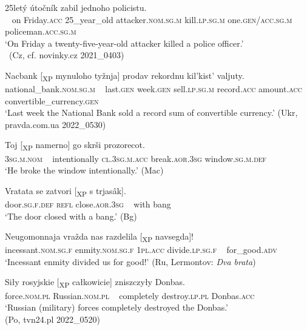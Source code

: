 \documentclass[output=paper]{langscibook}
\begin{document}
\ea%
    \label{ex:junghanns:1}
  \ea  {} 25letý útočník zabil jednoho policistu.\\
    ~ on Friday.\textsc{acc} 25\_year\_old attacker.\textsc{nom.sg.m} kill.\textsc{lp.sg.m} one.\textsc{gen/acc.sg.m} policeman.\textsc{acc.sg.m}\\
    \glt ‘On Friday a twenty-five-year-old attacker killed a police officer.’ \\\ \hfill (Cz, cf. novinky.cz 2021\_0403) \label{ex:junghanns:1a}

  \ex  \gll   Nacbank               [\textsubscript{XP} mynuloho tyžnja] prodav rekordnu  kil’kist’ valjuty.\\
    national\_bank.\textsc{nom.sg.m} ~                 last.\textsc{gen} week.\textsc{gen} sell.\textsc{lp.sg.m} record.\textsc{acc}  amount.\textsc{acc} convertible\_currency.\textsc{gen}\\
    \glt ‘Last week the National Bank sold a record sum of convertible currency.’ \hfill (Ukr, pravda.com.ua 2022\_0530) \label{ex:junghanns:1b}

  \ex \gll   Toj [\textsubscript{XP} namerno] go skrši prozorecot. \\
            \textsc{3sg.m.nom}   ~                  intentionally \textsc{cl.3sg.m.acc} break.\textsc{aor.3sg} window.\textsc{sg.m.def}\\
    \glt ‘He broke the window intentionally.’ \hfill (Mac) \label{ex:junghanns:1c}

  \ex  \gll   Vratata              se            zatvori                 [\textsubscript{XP} s trjasâk].\\
            door.\textsc{sg.f.def} \textsc{refl} close.\textsc{aor.3sg} ~                   with bang\\
    \glt ‘The door closed with a bang.’ \hfill (Bg) \label{ex:junghanns:1d}

  \ex  \gll   Neugomonnaja vražda nas razdelila [\textsubscript{XP} navsegda]!\\
    incessant.\textsc{nom.sg.f} enmity.\textsc{nom.sg.f} \textsc{1pl.acc}  divide.\textsc{lp.sg.f} ~  for\_good.\textsc{adv}\\
    \glt ‘Incessant enmity divided us for good!’ \hfill (Ru, Lermontov: \textit{Dva brata}) \label{ex:junghanns:1e}

  \ex  \gll   Siły rosyjskie [\textsubscript{XP} całkowicie] zniszczyły Donbas.\\
    force.\textsc{nom.pl} Russian.\textsc{nom.pl} ~ completely destroy.\textsc{lp.pl} Donbas.\textsc{acc}\\
    \glt ‘Russian (military) forces completely destroyed the Donbas.’ \\ \hfill (Po, tvn24.pl 2022\_0520) \label{ex:junghanns:1f}
\z
\z
\end{document}
